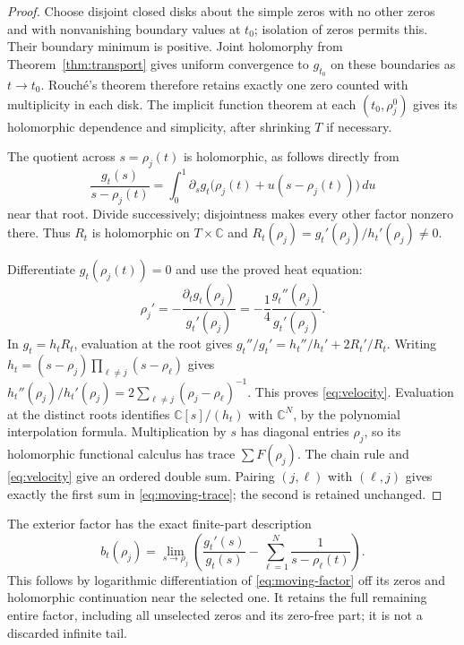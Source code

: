 \documentclass[11pt]{article}
\newcommand{\C}{\mathbb C}\newcommand{\R}{\mathbb R}
\begin{document}
\begin{proof}
Choose disjoint closed disks about the simple zeros with no other
zeros and with nonvanishing boundary values at $t_0$; isolation
of zeros permits this. Their boundary minimum is positive.
Joint holomorphy from Theorem~\ref{thm:transport} gives uniform
convergence to $g_{t_0}$ on these boundaries as $t\to t_0$.
Rouch\'e's theorem therefore retains exactly one zero counted with
multiplicity in each disk. The implicit function theorem at each
$(t_0,\rho_j^0)$ gives its holomorphic dependence and simplicity,
after shrinking $T$ if necessary.

The quotient across $s=\rho_j(t)$ is holomorphic, as follows
directly from
\[
\frac{g_t(s)}{s-\rho_j(t)}
=\int_0^1\partial_sg_t\bigl(\rho_j(t)
+u(s-\rho_j(t))\bigr)\,du
\]
near that root. Divide successively; disjointness makes every
other factor nonzero there. Thus $R_t$ is holomorphic on
$T\times\C$ and
$R_t(\rho_j)=g_t'(\rho_j)/h_t'(\rho_j)\ne0$.

Differentiate $g_t(\rho_j(t))=0$ and use the proved heat equation:
\[
\rho_j'=-\frac{\partial_tg_t(\rho_j)}{g_t'(\rho_j)}
=-\frac14\frac{g_t''(\rho_j)}{g_t'(\rho_j)}.
\]
In $g_t=h_tR_t$, evaluation at the root gives
$g_t''/g_t'=h_t''/h_t'+2R_t'/R_t$.
Writing $h_t=(s-\rho_j)\prod_{\ell\ne j}(s-\rho_\ell)$ gives
$h_t''(\rho_j)/h_t'(\rho_j)
=2\sum_{\ell\ne j}(\rho_j-\rho_\ell)^{-1}$.
This proves \eqref{eq:velocity}. Evaluation at the distinct roots
identifies $\C[s]/(h_t)$ with $\C^N$, by the polynomial
interpolation formula. Multiplication by $s$ has diagonal entries
$\rho_j$, so its holomorphic functional calculus has trace $\sum F(\rho_j)$.
The chain rule and \eqref{eq:velocity} give an ordered double sum.
Pairing $(j,\ell)$ with $(\ell,j)$ gives exactly the first sum in
\eqref{eq:moving-trace}; the second is retained unchanged.
\end{proof}

The exterior factor has the exact finite-part description
\begin{equation}\label{eq:exterior-finite-part}
b_t(\rho_j)=\lim_{s\to\rho_j}
\left(\frac{g_t'(s)}{g_t(s)}-
\sum_{\ell=1}^N\frac1{s-\rho_\ell(t)}\right).
\end{equation}
This follows by logarithmic differentiation of \eqref{eq:moving-factor}
off its zeros and holomorphic continuation near the selected one.
It retains the full remaining entire factor, including all unselected
zeros and its zero-free part; it is not a discarded infinite tail.
\end{document}
